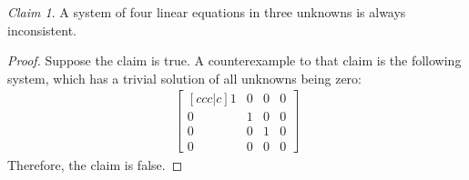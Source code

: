 \documentclass[letterpaper,12pt]{report}
\theoremstyle{remark}
\newtheorem*{claim}{Claim}
\begin{document}
\begin{claim}
A system of four linear equations in three unknowns is always inconsistent.
\end{claim}

\begin{proof}
Suppose the claim is true. A counterexample to that claim is the following system, which has a trivial solution of all unknowns being zero:
\begin{align*}
  & \begin{bmatrix}[ccc|c]
    1 & 0 & 0 & 0 \\
    0 & 1 & 0 & 0 \\
    0 & 0 & 1 & 0 \\
    0 & 0 & 0 & 0
  \end{bmatrix} &
\end{align*}
Therefore, the claim is false.
\end{proof}
\end{document}
